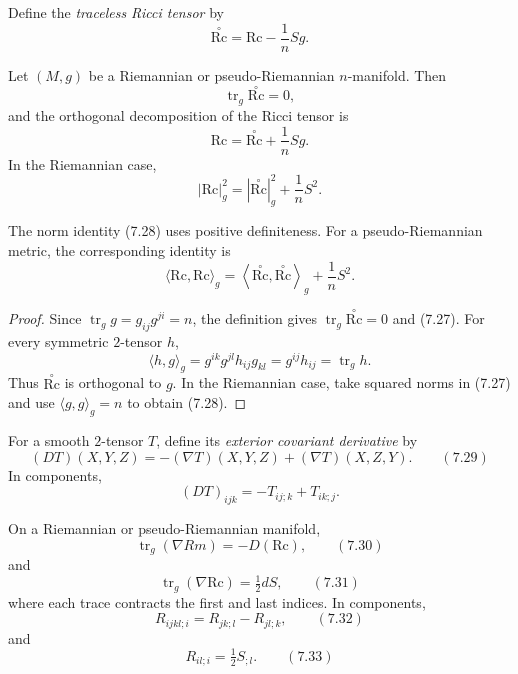 Define the \emph{traceless Ricci tensor} by
\[
\stackrel{\circ}{\mathrm{Rc}}
=\mathrm{Rc}-\frac1nSg.
\]

\begin{proposition}
\label{prop:ricci-tensor-decomposition}

Let $(M,g)$ be a Riemannian or pseudo-Riemannian $n$-manifold. Then
\[
\operatorname{tr}_g\stackrel{\circ}{\mathrm{Rc}}=0,
\]
and the orthogonal decomposition of the Ricci tensor is
\begin{equation}
\mathrm{Rc}=\stackrel{\circ}{\mathrm{Rc}}+\frac1nSg.
\tag{7.27}
\end{equation}
In the Riemannian case,
\begin{equation}
|\mathrm{Rc}|_g^2
=|\stackrel{\circ}{\mathrm{Rc}}|_g^2+\frac1nS^2.
\tag{7.28}
\end{equation}
\end{proposition}

\begin{remark}
The norm identity (7.28) uses positive definiteness. For a
pseudo-Riemannian metric, the corresponding identity is
\[
\langle\mathrm{Rc},\mathrm{Rc}\rangle_g
=\left\langle\stackrel{\circ}{\mathrm{Rc}},
\stackrel{\circ}{\mathrm{Rc}}\right\rangle_g+\frac1nS^2.
\]
\end{remark}

\begin{proof}
\sketch Since
$\operatorname{tr}_gg=g_{ij}g^{ji}=n$, the definition gives
$\operatorname{tr}_g\stackrel{\circ}{\mathrm{Rc}}=0$ and (7.27). For every
symmetric $2$-tensor $h$,
\[
\langle h,g\rangle_g
=g^{ik}g^{jl}h_{ij}g_{kl}
=g^{ij}h_{ij}
=\operatorname{tr}_gh.
\]
Thus $\stackrel{\circ}{\mathrm{Rc}}$ is orthogonal to $g$. In the Riemannian
case, take squared norms in (7.27) and use
$\langle g,g\rangle_g=n$ to obtain (7.28).
\end{proof}

For a smooth $2$-tensor $T$, define its \emph{exterior covariant derivative}
by
\[
(DT)(X,Y,Z)=-(\nabla T)(X,Y,Z)+(\nabla T)(X,Z,Y).
\qquad (7.29)
\]
In components,
\[
(DT)_{ijk}=-T_{ij;k}+T_{ik;j}.
\]

\begin{proposition}
\label{prop:contracted-bianchi-identities}

On a Riemannian or pseudo-Riemannian manifold,
\[
\operatorname{tr}_g(\nabla Rm)=-D(\mathrm{Rc}),
\qquad (7.30)
\]
and
\[
\operatorname{tr}_g(\nabla\mathrm{Rc})=\tfrac12dS,
\qquad (7.31)
\]
where each trace contracts the first and last indices. In components,
\[
R_{ijkl;i}=R_{jk;l}-R_{jl;k},
\qquad (7.32)
\]
and
\[
R_{il;i}=\tfrac12S_{;l}.
\qquad (7.33)
\]
\end{proposition}


